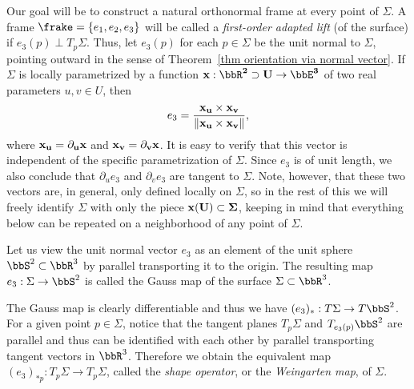 Our goal will be to construct a natural orthonormal frame at every point of $\Sigma$. A frame $\frake=\{e_1,e_2,e_3\}$ will be called a \emph{first-order adapted lift} (of the surface) if $e_3(p)\perp T_p \Sigma$. 
Thus, let $e_3(p)$ for each $p\in\Sigma$ be the unit normal to $\Sigma$, pointing outward in the sense of Theorem~\ref{thm orientation via normal vector}.  If $\Sigma$ is locally parametrized by a function $\bf{ x}: \bbR^2\supset U\to\bbE^3$ of two real parameters $u,v\in U$, then 
\[e_3=\frac{\bf{ x}_u\times \bf{x}_v}{\lVert \bf{x}_u\times \bf{x}_v\rVert},\]
where $\bf{x}_u=\partial_u \bf{x}$ and $\bf{x}_v=\partial_v \bf{x}$. It is easy to verify that this vector is independent of the specific parametrization of $\Sigma$. Since $e_3$ is of unit length, we also conclude that $\partial_u e_3$ and $\partial_v e_3$ are tangent to $\Sigma$. Note, however, that these two vectors are, in general, only defined locally on $\Sigma$, so in the rest of this \subsect we will freely identify $\Sigma$ with only the piece $\bf{x}(U)\subset \Sigma$, keeping in mind that everything below can be repeated on a neighborhood of any point of $\Sigma$.

\begin{defn}
    Let us view the unit normal vector $e_3$ as an element of the unit sphere $\bbS^2\subset\bbR^3$ by parallel transporting it to the origin. The resulting map $e_3:\Sigma\to \bbS^2$ is called the Gauss map of the surface $\Sigma\subset \bbR^3$.
\end{defn}

The Gauss map is clearly differentiable and thus we have $(e_3)_\ast:T\Sigma\to T\bbS^2$. For a given point $p\in\Sigma$, notice that the tangent planes $T_p\Sigma$ and $T_{e_3(p)}\bbS^2$ are parallel and thus can be identified with each other by parallel transporting tangent vectors in $\bbR^3$. Therefore we obtain the equivalent map $(e_3)_{\ast p}:T_p\Sigma\to T_p\Sigma$, called the \emph{shape operator}, or the \emph{Weingarten map}, of $\Sigma$.

